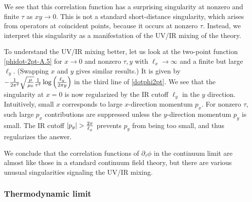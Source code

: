 \documentclass[12pt]{article}
\numberwithin{equation}{section}
\begin{document}
We see that this correlation function has a surprising singularity at nonzero and finite $\tau$ as $xy\to 0$.
This is not a standard short-distance singularity, which arises from operators at coincident points, because it occurs at nonzero $\tau$. Instead, we interpret this singularity as a manifestation of the UV/IR mixing of the theory.


To understand the UV/IR mixing better, let us look at the two-point function \eqref{phidot-2pt-A.5} for $x\rightarrow 0$ and nonzero $\tau,y$ with $\ell_x\rightarrow\infty$ and a finite but large $\ell_y$.  (Swapping $x$ and $y$ gives similar results.)  It is given by $-{1\over 2\pi^2} \sqrt{\mu\over\mu_0} {1\over\tau^2} \log \left({\ell_y\over 2\pi y}\right)$ in the third line of \eqref{dotphi2pt}.  We see that the singularity at $x=0$ is now regularized  by the IR cutoff $\ell_y$ in the $y$ direction. Intuitively, small $x$ corresponds to large $x$-direction momentum $p_x$. For nonzero $\tau$, such large $p_x$ contributions are suppressed unless the $y$-direction momentum $p_y$ is small. The IR cutoff $|p_y|>{2\pi\over \ell_y}$ prevents $p_y$ from being too small, and thus regularizes the answer.



We conclude that the correlation functions of $\partial_\tau\phi$ in the continuum limit are almost like those in a standard continuum field theory, but there are various unusual singularities signaling the UV/IR mixing.


\subsubsection{Thermodynamic limit}
\end{document}
